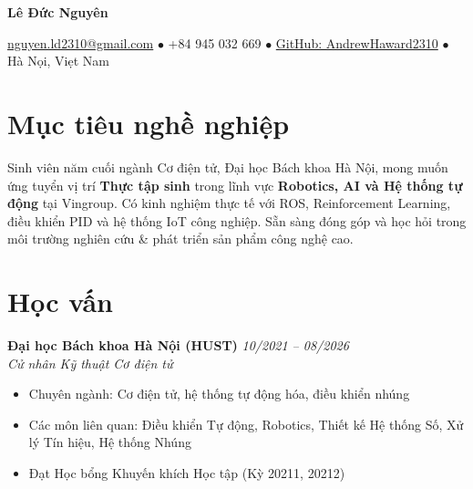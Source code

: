 \documentclass[11pt,a4paper]{article}
\newcommand{\cvname}[1]{
  \centerline{\LARGE\textbf{#1}}
  \vspace{0.3em}
}
\newcommand{\cvcontact}[1]{
  \centerline{\small #1}
}
\newcommand{\cventry}[4]{
  \noindent\textbf{#1} \hfill \textit{#2} \\
  \textit{#3} \\
  #4
  \vspace{0.4em}
}
\begin{document}
\cvname{Lê Đức Nguyên}

\cvcontact{
  \href{mailto:nguyen.ld2310@gmail.com}{nguyen.ld2310@gmail.com}
  \quad $\bullet$ \quad +84 945 032 669
  \quad $\bullet$ \quad \href{https://github.com/AndrewHaward2310}{GitHub: AndrewHaward2310}
  \quad $\bullet$ \quad H\`a N\d{o}i, Vi\d{e}t Nam
}

\vspace{0.5em}

\section{Mục tiêu nghề nghiệp}

Sinh viên năm cuối ngành Cơ điện tử, Đại học Bách khoa Hà Nội, mong muốn ứng tuyển vị trí \textbf{Thực tập sinh} trong lĩnh vực \textbf{Robotics, AI và Hệ thống tự động} tại Vingroup. Có kinh nghiệm thực tế với ROS, Reinforcement Learning, điều khiển PID và hệ thống IoT công nghiệp. Sẵn sàng đóng góp và học hỏi trong môi trường nghiên cứu \& phát triển sản phẩm công nghệ cao.

\section{Học vấn}

\cventry
  {Đại học Bách khoa Hà Nội (HUST)}
  {10/2021 -- 08/2026}
  {Cử nhân Kỹ thuật Cơ điện tử}
  {
    \begin{itemize}[leftmargin=1.5em, topsep=0pt, itemsep=0.15em]
      \item Chuyên ngành: Cơ điện tử, hệ thống tự động hóa, điều khiển nhúng
      \item Các môn liên quan: Điều khiển Tự động, Robotics, Thiết kế Hệ thống Số, Xử lý Tín hiệu, Hệ thống Nhúng
      \item Đạt Học bổng Khuyến khích Học tập (Kỳ 20211, 20212)
    \end{itemize}
  }

\end{document}
